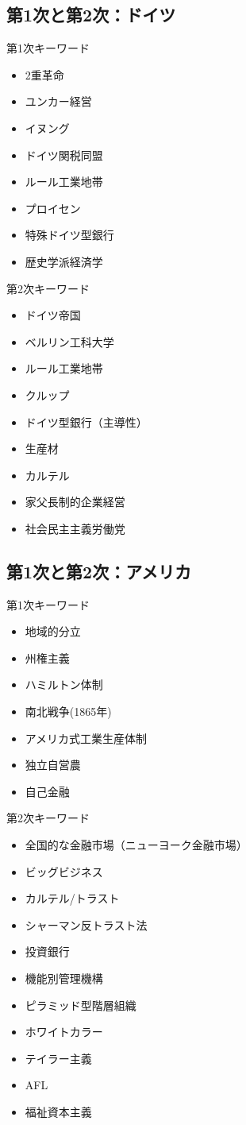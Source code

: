 \documentclass{jsarticle}
\begin{document}
\subsection{第1次と第2次：ドイツ}
第1次キーワード
\begin{itemize}
\item 2重革命
\item ユンカー経営
\item イヌング
\item ドイツ関税同盟
\item ルール工業地帯
\item プロイセン
\item 特殊ドイツ型銀行
\item 歴史学派経済学
\end{itemize}
第2次キーワード
\begin{itemize}
\item ドイツ帝国
\item ベルリン工科大学
\item ルール工業地帯
\item クルップ
\item ドイツ型銀行（主導性）
\item 生産材
\item カルテル
\item 家父長制的企業経営
\item 社会民主主義労働党
\end{itemize}

\subsection{第1次と第2次：アメリカ}
第1次キーワード
\begin{itemize}
\item 地域的分立
\item 州権主義
\item ハミルトン体制
\item 南北戦争(1865年)
\item アメリカ式工業生産体制
\item 独立自営農
\item 自己金融
\end{itemize}
第2次キーワード
\begin{itemize}
\item 全国的な金融市場（ニューヨーク金融市場）
\item ビッグビジネス
\item カルテル/トラスト
\item シャーマン反トラスト法
\item 投資銀行
\item 機能別管理機構
\item ピラミッド型階層組織
\item ホワイトカラー
\item テイラー主義
\item AFL
\item 福祉資本主義
\end{itemize}
\end{document}
